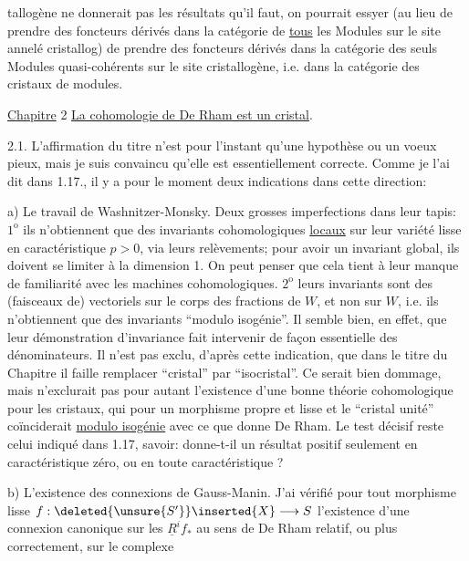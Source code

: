 tallogène ne donnerait pas les résultats qu'il faut, on pourrait essyer (au lieu de prendre des foncteurs dérivés dans la catégorie de \uline{tous} les Modules sur le site annelé cristallog) de prendre des foncteurs dérivés dans la catégorie des seuls Modules quasi-cohérents sur le site cristallogène, i.e. dans la catégorie des cristaux de modules. 

\uline{Chapitre} 2 \uline{La cohomologie de De Rham est un cristal}.

2.1. L'affirmation du titre n'est pour l'instant qu'une hypothèse ou un voeux pieux, mais je suis convaincu qu'elle est essentiellement correcte. Comme je l'ai dit dans 1.17., il y a pour le moment deux indications dans cette direction:

a) Le travail de Washnitzer-Monsky. Deux grosses imperfections dans leur tapis: $1^{\mathrm{o}}$ ils n'obtiennent que des invariants cohomologiques \uline{locaux} sur leur variété lisse en caractéristique $p>0$, via leurs relèvements; pour avoir un invariant global, ils doivent se limiter à la dimension 1. On peut penser que cela tient à leur manque de familiarité avec les machines cohomologiques. $2^{\mathrm{o}}$ leurs invariants sont des (faisceaux de) vectoriels sur le corps des fractions de $W$, et non sur $W$, i.e. ils n'obtiennent que des invariants ``modulo isogénie''. Il semble bien, en effet, que leur démonstration d'invariance fait intervenir de façon  essentielle des dénominateurs. Il n'est pas exclu, d'après cette indication, que dans le titre du Chapitre il faille remplacer ``cristal'' par ``isocristal''. Ce serait bien dommage, mais n'exclurait pas pour autant l'existence d'une bonne théorie cohomologique pour les cristaux, qui pour un morphisme propre et lisse et le ``cristal unité'' coïnciderait \uline{modulo isogénie} avec ce que donne De Rham. Le test décisif reste celui indiqué dans 1.17, savoir: donne-t-il un résultat positif seulement en caractéristique zéro, ou en toute caractéristique ?

b) L'existence des connexions de Gauss-Manin.  J'ai vérifié pour tout morphisme lisse $f:\deleted{\unsure{S'}}\inserted{X}\longrightarrow S$ l'existence d'une connexion canonique  sur les $\underline{R}^if_*$ au sens de De Rham relatif, ou plus correctement, sur le complexe
